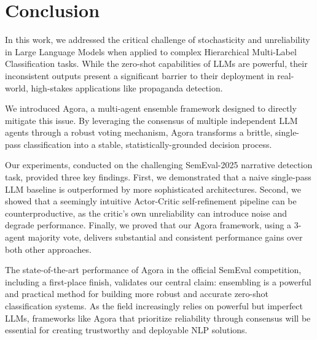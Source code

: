 \section{Conclusion}

In this work, we addressed the critical challenge of stochasticity and unreliability in Large Language Models when applied to complex Hierarchical Multi-Label Classification tasks. While the zero-shot capabilities of LLMs are powerful, their inconsistent outputs present a significant barrier to their deployment in real-world, high-stakes applications like propaganda detection.

We introduced Agora, a multi-agent ensemble framework designed to directly mitigate this issue. By leveraging the consensus of multiple independent LLM agents through a robust voting mechanism, Agora transforms a brittle, single-pass classification into a stable, statistically-grounded decision process.

Our experiments, conducted on the challenging SemEval-2025 narrative detection task, provided three key findings. First, we demonstrated that a naive single-pass LLM baseline is outperformed by more sophisticated architectures. Second, we showed that a seemingly intuitive Actor-Critic self-refinement pipeline can be counterproductive, as the critic's own unreliability can introduce noise and degrade performance. Finally, we proved that our Agora framework, using a 3-agent majority vote, delivers substantial and consistent performance gains over both other approaches.

The state-of-the-art performance of Agora in the official SemEval competition, including a first-place finish, validates our central claim: ensembling is a powerful and practical method for building more robust and accurate zero-shot classification systems. As the field increasingly relies on powerful but imperfect LLMs, frameworks like Agora that prioritize reliability through consensus will be essential for creating trustworthy and deployable NLP solutions.